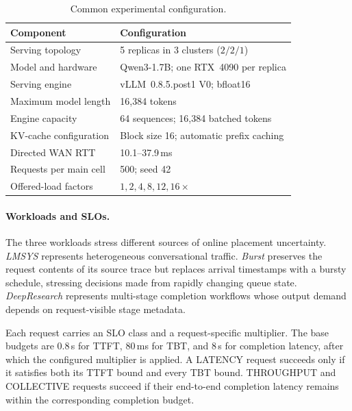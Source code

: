 \begin{table}[t]
    \centering
    \small
    \caption{Common experimental configuration.}
    \label{tab:eval-setup}
    \setlength{\tabcolsep}{3pt}
    \renewcommand{\arraystretch}{1.08}
    \begin{tabular}{@{}p{}p{}@{}}
        \toprule
        \textbf{Component} & \textbf{Configuration} \\
        \midrule
        Serving topology
          & 5 replicas in 3 clusters ($2/2/1$) \\
        Model and hardware
          & Qwen3-1.7B; one RTX~4090 per replica \\
        Serving engine
          & vLLM~0.8.5.post1 V0; bfloat16 \\
        Maximum model length
          & 16,384 tokens \\
        Engine capacity
          & 64 sequences; 16,384 batched tokens \\
        KV-cache configuration
          & Block size 16; automatic prefix caching \\
        Directed WAN RTT
          & 10.1--37.9\,ms \\
        Requests per main cell
          & 500; seed 42 \\
        Offered-load factors
          & $1,2,4,8,12,16\times$ \\
        \bottomrule
    \end{tabular}
\end{table}

\paragraph{Workloads and SLOs.}
The three workloads stress different sources of online placement uncertainty.
\emph{LMSYS} represents heterogeneous conversational traffic.
\emph{Burst} preserves the request contents of its source trace but replaces
arrival timestamps with a bursty schedule, stressing decisions made from
rapidly changing queue state.
\emph{DeepResearch} represents multi-stage completion workflows whose output
demand depends on request-visible stage metadata.

Each request carries an SLO class and a request-specific multiplier.
The base budgets are 0.8\,s for TTFT, 80\,ms for TBT, and 8\,s for completion
latency, after which the configured multiplier is applied.
A LATENCY request succeeds only if it satisfies both its TTFT bound and every
TBT bound.
THROUGHPUT and COLLECTIVE requests succeed if their end-to-end completion
latency remains within the corresponding completion budget.

